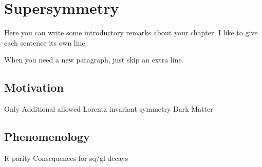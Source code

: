 

\chapter[Supersymmetry][Top of Page Title]{Supersymmetry}

Here you can write some introductory remarks about your chapter.
I like to give each sentence its own line.

When you need a new paragraph, just skip an extra line.

\section*{Motivation}

Only Additional allowed Lorentz invariant symmetry
Dark Matter

\section*{Phenomenology}

R parity
Consequences for sq/gl decays
